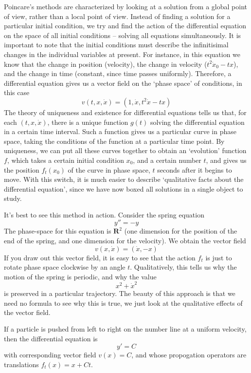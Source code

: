 Poincare's methods are characterized by looking at a solution from a global point of view, rather than a local point of view. Instead of finding a solution for a particular initial condition, we try and find the action of the differential equation on the space of all initial conditions -- solving all equations simultaneously. It is important to note that the initial conditions must describe the infinitisimal changes in the individual variables at present. For instance, in this equation we know that the change in position (velocity), the change in velocity ($t^2 \dot{x}_0 - tx$), and the change in time (constant, since time passes uniformly). Therefore, a differential equation gives us a vector field on the `phase space' of conditions, in this case
%
\[ v(t,x,\dot{x}) = (1,\dot{x},t^2 \dot{x} - tx) \]
%
The theory of uniqueness and existence for differential equations tells us that, for each $(t,x,\dot{x})$, there is a unique function $g(t)$ solving the differential equation in a certain time interval. Such a function gives us a particular curve in phase space, taking the conditions of the function at a particular time point. By uniqueness, we can put all these curves together to obtain an `evolution' function $f$, which takes a certain initial condition $x_0$, and a certain number $t$, and gives us the position $f_t(x_0)$ of the curve in phase space, $t$ seconds after it begins to move. With this switch, it is much easier to describe `qualitative facts about the differential equation', since we have now boxed all solutions in a single object to study.

\begin{example}
    It's best to see this method in action. Consider the spring equation
    \[ y'' = -y \]
    The phase-space for this equation is $\mathbf{R}^2$ (one dimension for the position of the end of the spring, and one dimension for the velocity). We obtain the vector field
    \[ v(x,\dot{x}) = (\dot{x}, -x) \]
    If you draw out this vector field, it is easy to see that the action $f_t$ is just to rotate phase space clockwise by an angle $t$. Qualitatively, this tells us why the motion of the spring is periodic, and why the value
    \[ x^2 + \dot{x}^2 \]
    is preserved in a particular trajectory. The beauty of this approach is that we need no formula to see why this is true, we just look at the qualitative effects of the vector field.
\end{example}

\begin{example}
    If a particle is pushed from left to right on the number line at a uniform velocity, then the differential equation is
    \[ y' = C \]
    with corresponding vector field $v(x) = C$, and whose propogation operators are translations $f_t(x) = x + Ct$.
\end{example}

